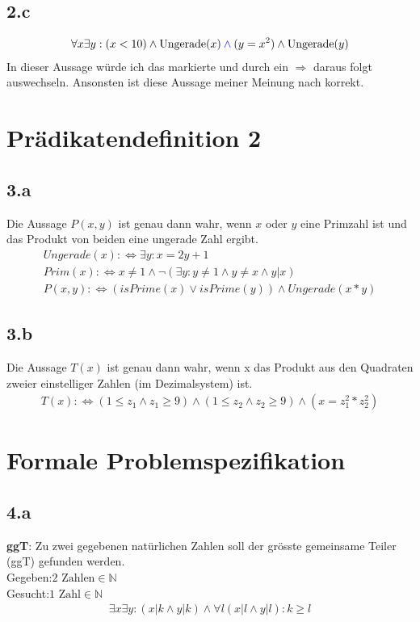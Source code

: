 \documentclass[10pt,ngerman]{scrartcl}
\begin{document}
\subsection{2.c}
\setcounter{equation}{0}
\begin{align*}
\forall x \exists y: (x < 10) \wedge \text{Ungerade(}x\text{)} \color{blue}\wedge\color{black} (y = x^2) \wedge \text{Ungerade(}y\text{)}
\end{align*}
In dieser Aussage würde ich das markierte und durch ein $\Rightarrow$ \glqq daraus folgt{} auswechseln. Ansonsten ist diese Aussage meiner Meinung nach korrekt.
\pagebreak
\section{Prädikatendefinition 2}
\subsection{3.a}
Die Aussage $P(x, y)$ ist genau dann wahr, wenn $x$ oder $y$ eine Primzahl ist und das
Produkt von beiden eine ungerade Zahl ergibt.
\setcounter{equation}{0}
\begin{align}
Ungerade(x):\Leftrightarrow \exists y : x = 2y +1\\
Prim(x): \Leftrightarrow x \ne 1 \wedge \neg (\exists y : y \ne 1 \wedge y \ne x \wedge y|x)\\
P(x,y) :\Leftrightarrow (isPrime(x) \vee isPrime(y)) \wedge Ungerade(x * y)
\end{align}
\subsection{3.b}
Die Aussage $T(x)$ ist genau dann wahr, wenn x das Produkt aus den Quadraten zweier
einstelliger Zahlen (im Dezimalsystem) ist.
\setcounter{equation}{0}
\begin{align*}
T(x) :\Leftrightarrow (1 \leq z_1 \wedge z_1 \geq 9) \wedge (1 \leq z_2 \wedge z_2 \geq 9) \wedge (x = z_1^2*z_2^2)
\end{align*}
\section{Formale Problemspezifikation}
\subsection{4.a}
\textbf{ggT}: Zu zwei gegebenen natürlichen Zahlen soll der grösste gemeinsame Teiler (ggT) gefunden werden.\vspace{0.5 cm}\\
Gegeben:$2 \text{ Zahlen} \in \mathbb{N}$\\
Gesucht:$1 \text{ Zahl} \in \mathbb{N}$
\setcounter{equation}{0}
\begin{align*}
\exists x \exists y : (x|k \wedge y|k) \wedge \forall l (x|l \wedge y|l): k \geq l
\end{align*}
\end{document}
